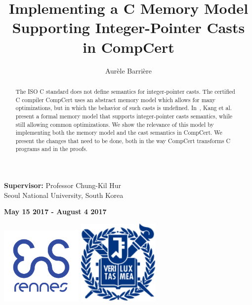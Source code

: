 \documentclass{llncs2e/llncs}
\begin{document}
%
\pagestyle{headings}  %
%
\title{Implementing a C Memory Model Supporting Integer-Pointer Casts in CompCert}
%
\author{Aur\`ele Barri\`ere}
%
%

\maketitle              %

\hrulefill

\begin{center}
  \textbf{Supervisor: } Professor Chung-Kil Hur\\
  Seoul National University, South Korea
\end{center}

\hrulefill

\begin{center}
  \textbf{May 15 2017 - August 4 2017}
\end{center}

\vfill
\begin{center}
\includegraphics[width=4cm]{img/enslogo.png}
\quad\quad\quad
\includegraphics[width=4cm]{img/snulogo.png}
\end{center}
\vfill
\begin{abstract}
  The ISO C standard does not define semantics for integer-pointer casts. The certified C compiler CompCert uses an abstract memory model which allows for many optimizations, but in which the behavior of such casts is undefined. In~\cite{DBLP:conf/pldi/KangHMGZV15}, Kang et al. present a formal memory model that supports integer-pointer casts semantics, while still allowing common optimizations.
  We show the relevance of this model by implementing both the memory model and the cast semantics in CompCert. We present the changes that need to be done, both in the way CompCert transforms C programs and in the proofs.
\end{abstract}
%
\newpage
\end{document}

